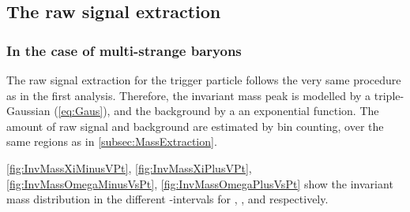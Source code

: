 \subsection{The raw signal extraction}
\label{subsec:CascadeResonanceSignalExtraction}

\subsubsection{In the case of multi-strange baryons}

The raw signal extraction for the trigger particle follows the very same procedure as in the first analysis. Therefore, the invariant mass peak is modelled by a triple-Gaussian (\eq\ref{eq:Gaus}), and the background by a an exponential function. The amount of raw signal and background are estimated by bin counting, over the same regions as in \Sec\ref{subsec:MassExtraction}. 

\Figs\ref{fig:InvMassXiMinusVPt}, \ref{fig:InvMassXiPlusVPt}, \ref{fig:InvMassOmegaMinusVsPt}, \ref{fig:InvMassOmegaPlusVsPt} show the invariant mass distribution in the different \pT-intervals for \rmXiM, \rmAxiP, \rmOmegaM and \rmAomegaP respectively.

